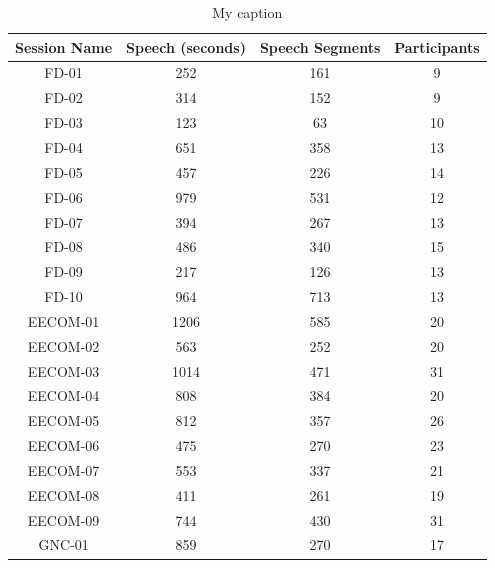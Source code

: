 \documentclass[journal]{IEEEtran}
\begin{document}
\begin{table}[t]
\centering
\caption{My caption}
\label{my-label}
\small
\begin{tabular}{|c|c|c|c|}
\hline
Session Name & Speech (seconds) & Speech Segments & Participants \\ \hline
FD-01        & 252              & 161             & 9            \\ \hline
FD-02        & 314              & 152             & 9            \\ \hline
FD-03        & 123              & 63              & 10           \\ \hline
FD-04        & 651              & 358             & 13           \\ \hline
FD-05        & 457              & 226             & 14           \\ \hline
FD-06        & 979              & 531             & 12           \\ \hline
FD-07        & 394              & 267             & 13           \\ \hline
FD-08        & 486              & 340             & 15           \\ \hline
FD-09        & 217              & 126             & 13           \\ \hline
FD-10        & 964              & 713             & 13           \\ \hline
EECOM-01     & 1206             & 585             & 20           \\ \hline
EECOM-02     & 563              & 252             & 20           \\ \hline
EECOM-03     & 1014             & 471             & 31           \\ \hline
EECOM-04     & 808              & 384             & 20           \\ \hline
EECOM-05     & 812              & 357             & 26           \\ \hline
EECOM-06     & 475              & 270             & 23           \\ \hline
EECOM-07     & 553              & 337             & 21           \\ \hline
EECOM-08     & 411              & 261             & 19           \\ \hline
EECOM-09     & 744              & 430             & 31           \\ \hline
GNC-01       & 859              & 270             & 17           \\ \hline

\end{tabular}
\end{table}
\end{document}
